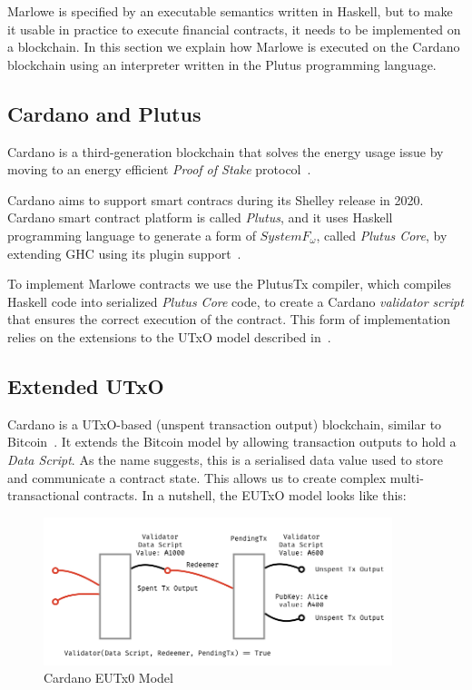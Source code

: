 \documentclass[runningheads]{llncs}
\begin{document}
Marlowe is specified by an executable semantics written in Haskell, but to make it usable in practice to execute financial contracts, it needs to be implemented on a blockchain. In this section we explain how Marlowe is executed on the Cardano blockchain using an interpreter written in the Plutus programming language.

\subsection{Cardano and Plutus}

Cardano is a third-generation blockchain that solves the energy usage
issue by moving to an energy efficient \emph{Proof of Stake} protocol~\cite{Ouroboros-Genesis}.

Cardano aims to support smart contracs during its Shelley release in 2020.
Cardano smart contract platform is called \emph{Plutus}, and
it uses Haskell programming language to generate a form of $System F_{\omega}$,
called \emph{Plutus Core}, by extending GHC using its plugin
support~\cite[Section 13.3]{ghcusersguide}.

To implement Marlowe contracts we use the PlutusTx compiler,
which compiles Haskell code into serialized \emph{Plutus Core} code,
to create a Cardano \emph{validator script} that ensures the correct execution of the contract.
This form of implementation relies on the extensions to the UTxO model described in~\cite{PlutusPlatform}.


\subsection{Extended UTxO}

Cardano is a UTxO-based (unspent transaction output) blockchain, similar to Bitcoin~\cite{sok}.
It extends the Bitcoin model by allowing transaction outputs to hold a \emph{Data Script}.
As the name suggests, this is  a serialised data value used to store and communicate a contract state.
This allows us to create complex multi-transactional contracts.
In a nutshell, the EUTxO model looks like this:

\begin{figure}[!h]
    \centering
    \includegraphics[width=4in]{figures/Marlowe3-Figures-003.jpeg}
    \caption{Cardano EUTx0 Model}
    \label{fig:eutxo}
\end{figure}
\end{document}
